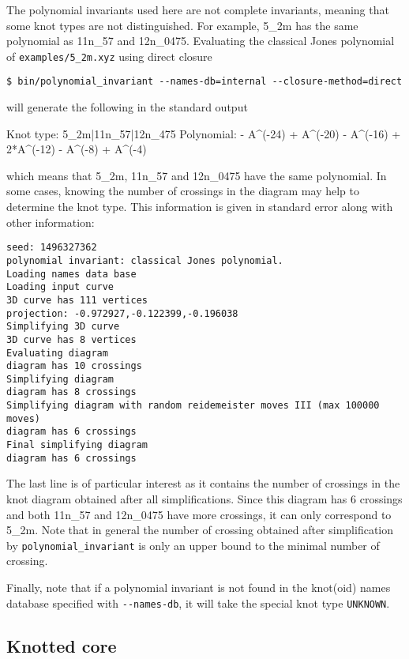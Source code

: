 The polynomial invariants used here are not complete invariants, meaning that some knot types are not distinguished. For example, 5\_2m has the same polynomial as 11n\_57 and 12n\_0475. Evaluating the classical Jones polynomial of \lstinline{examples/5_2m.xyz} using direct closure 
\begin{lstlisting}
$ bin/polynomial_invariant --names-db=internal --closure-method=direct
\end{lstlisting}
will generate the following in the standard output
\begin{lstlistingsmall}
Knot type: 5_2m|11n_57|12n_475  Polynomial:  - A^(-24) + A^(-20) - A^(-16) + 2*A^(-12) - A^(-8) + A^(-4)
\end{lstlistingsmall}
which means that 5\_2m, 11n\_57 and 12n\_0475 have the same polynomial. In some cases, knowing the number of crossings in the diagram may help to determine the knot type. This information is given in standard error along with other information:
\begin{lstlisting}
seed: 1496327362
polynomial invariant: classical Jones polynomial.
Loading names data base
Loading input curve
3D curve has 111 vertices
projection: -0.972927,-0.122399,-0.196038
Simplifying 3D curve
3D curve has 8 vertices
Evaluating diagram
diagram has 10 crossings
Simplifying diagram
diagram has 8 crossings
Simplifying diagram with random reidemeister moves III (max 100000 moves)
diagram has 6 crossings
Final simplifying diagram
diagram has 6 crossings
\end{lstlisting}
The last line is of particular interest as it contains the number of crossings in the knot diagram obtained after all simplifications. Since this diagram has 6 crossings and both 11n\_57 and 12n\_0475 have more crossings, it can only correspond to 5\_2m. Note that in general the number of crossing obtained after simplification by \lstinline{polynomial_invariant} is only an upper bound to the minimal number of crossing.

Finally, note that if a polynomial invariant is not found in the knot(oid) names database specified with  \lstinline{--names-db}, it will take the special knot type \lstinline{UNKNOWN}.

\subsection{Knotted core}
